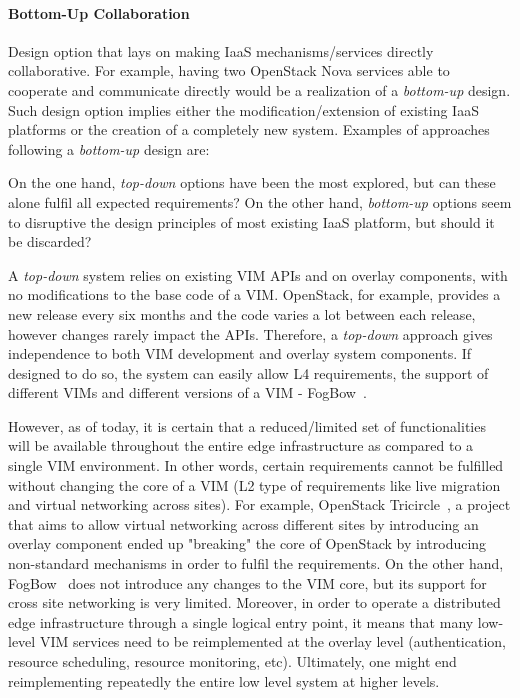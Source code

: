 \paragraph{Bottom-Up Collaboration} Design option that lays on making IaaS mechanisms/services directly collaborative. For example, having two OpenStack Nova services able to cooperate and communicate directly would be a realization of a \emph{bottom-up} design. Such design option implies either the modification/extension of existing IaaS platforms or the creation of a completely new system. Examples of approaches following a \emph{bottom-up} design are:

On the one hand, \emph{top-down} options have been the most explored, but can these alone fulfil all expected requirements? On the other hand, \emph{bottom-up} options seem to disruptive the design principles of most existing IaaS platform, but should it be discarded?




A \emph{top-down} system  relies on existing VIM APIs and on overlay components, with no modifications to the base code of a VIM.
OpenStack, for example, provides a new release every six months and the code varies a lot between each release, however changes rarely impact the APIs.  Therefore, a \emph{top-down} approach gives independence to both VIM development and overlay system components. 
If designed to do so, the system can easily allow L4 requirements, \ie the support of different VIMs and different versions of a VIM - \eg FogBow~\cite{brasileiro2016fogbow}.


However, as of today, it is certain that a reduced/limited set of functionalities will be available throughout the entire edge infrastructure as compared to a single VIM environment. In other words, certain requirements cannot be fulfilled without changing the core of a VIM (\eg L2 type of requirements like live migration and virtual networking across sites). For example, OpenStack Tricircle~\cite{tricircle}, a project that aims to allow virtual networking across different sites by introducing an overlay component ended up "breaking" the core of OpenStack by introducing non-standard mechanisms in order to fulfil the requirements. On the other hand, FogBow~\cite{brasileiro2016fogbow} does not introduce any changes to the VIM core, but its support for cross site networking is very limited.
Moreover, in order to operate a distributed edge infrastructure through a single logical entry point, it means that many low-level VIM services need to be reimplemented at the overlay level (\eg authentication, resource scheduling, resource monitoring, etc). Ultimately, one might end reimplementing repeatedly the entire low level system at higher levels.



